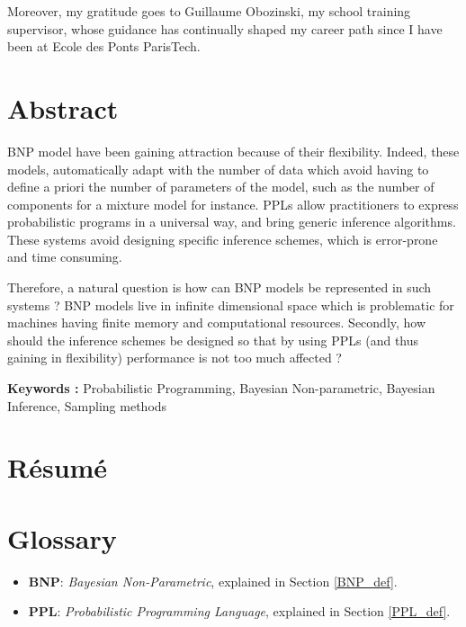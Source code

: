 \documentclass[twoside,10pt,openany,a4paper]{rapport}
\begin{document}
Moreover, my gratitude goes to Guillaume Obozinski, my school training supervisor, whose guidance has continually shaped my career path since I have been at Ecole des Ponts ParisTech.

\chapter{Abstract}

\gls{BNP} model have been gaining attraction because of their flexibility. Indeed, these models, automatically adapt with the number of data which avoid having to define a priori the number of parameters of the model, such as the number of components for a mixture model for instance.
\gls{PPLs} allow practitioners to express probabilistic programs in a universal way, and bring generic inference algorithms. These systems avoid designing specific inference schemes, which is error-prone and time consuming.

Therefore, a natural question is how can \gls{BNP} models be represented in such systems ? BNP models live in infinite dimensional space which is problematic for machines having finite memory and computational resources.
Secondly, how should the inference schemes be designed so that by using \gls{PPL}s (and thus gaining in flexibility) performance is not too much affected ?

\textbf{Keywords :} Probabilistic Programming, Bayesian Non-parametric, Bayesian Inference, Sampling methods


\chapter{Résumé}



\tableofcontents
{}
\listoffigures
{}

\chapter{Glossary}

\begin{itemize} 
\item \textbf{BNP}:  \textit{Bayesian Non-Parametric}, explained in Section \ref{BNP_def}. \\
\item \textbf{PPL}:  \textit{Probabilistic Programming Language}, explained in Section \ref{PPL_def}. \\

\end{itemize}
\end{document}
